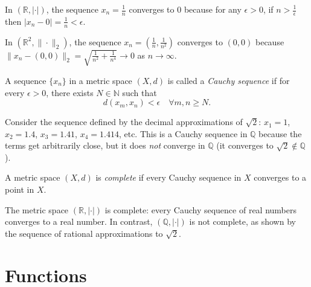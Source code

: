 \begin{example}
In $(\mathbb{R}, |\cdot|)$, the sequence $x_n = \frac{1}{n}$ converges to $0$ because for any $\epsilon > 0$, if $n > \frac{1}{\epsilon}$ then $|x_n - 0| = \frac{1}{n} < \epsilon$.
\end{example}

\begin{example}
In $(\mathbb{R}^2, \|\cdot\|_2)$, the sequence $x_n = \left(\frac{1}{n}, \frac{1}{n^2}\right)$ converges to $(0,0)$ because $\|x_n - (0,0)\|_2 = \sqrt{\frac{1}{n^2} + \frac{1}{n^4}} \to 0$ as $n \to \infty$.
\end{example}

\begin{definition}
A sequence $\{x_n\}$ in a metric space $(X,d)$ is called a \emph{Cauchy sequence} if for every $\epsilon > 0$, there exists $N \in \mathbb{N}$ such that
\begin{equation}
d(x_m, x_n) < \epsilon \quad \forall m,n \geq N.
\end{equation}
\end{definition}

\begin{example}
Consider the sequence defined by the decimal approximations of $\sqrt{2}$: $x_1 = 1$, $x_2 = 1.4$, $x_3 = 1.41$, $x_4 = 1.414$, etc.  
This is a Cauchy sequence in $\mathbb{Q}$ because the terms get arbitrarily close, but it does \emph{not} converge in $\mathbb{Q}$ (it converges to $\sqrt{2} \notin \mathbb{Q}$).
\end{example}

\begin{definition}
A metric space $(X,d)$ is \emph{complete} if every Cauchy sequence in $X$ converges to a point in $X$.
\end{definition}

\begin{example}
The metric space $(\mathbb{R}, |\cdot|)$ is complete: every Cauchy sequence of real numbers converges to a real number.  
In contrast, $(\mathbb{Q}, |\cdot|)$ is not complete, as shown by the sequence of rational approximations to $\sqrt{2}$.
\end{example}

\section{Functions}

